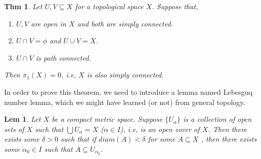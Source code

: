 \documentclass[paper=a4, fontsize=11pt]{scrartcl}
\newtheorem{theorem}{Thm}
\newtheorem{lemma}{Lem}
\begin{document}
\begin{theorem}Let $U,V \subseteq X$ for a topological space $X$. Suppose that,
	\begin{enumerate}
		\item $U,V $ are open in $X$ and both are simply connected.
		\item $U \cap V = \phi$ and $U \cup V = X$.
		\item $U \cap V$ is path connected. 
	\end{enumerate}	
	Then $\pi_1(X)=0$, i.e, $X$ is also simply connected.
\end{theorem}

In order to prove this theorem, we need to introduce a lemma named Lebesguq number lemma, which we might have learned (or not) from general topology. \\

\begin{lemma}
	Let $X$ be a compact metric space. Suppose $\{U_\alpha \}$ is a collection of open sets of $X$ such that $\bigcup U_\alpha = X$ ($\alpha \in I$), i.e, is an open cover of $X$. Then there exists some $\delta >0$ such that if $diam(A) < \delta$ for some $A \subseteq X$ , then there exists some $\alpha_0 \in I $ such that $A \subseteq U_{\alpha_0}$. \\
\end{lemma}
\end{document}
